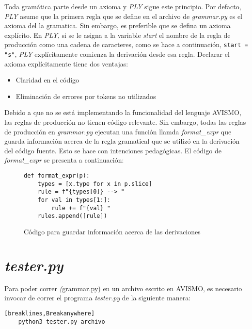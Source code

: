 Toda gramática parte desde un axioma y \textit{PLY} sigue este principio.
Por defacto, \textit{PLY} asume que la primera regla que se define en el archivo de \textit{grammar.py} es el axioma del la gramatica.
Sin embargo, es preferible que se defina un axioma explícito.
En \textit{PLY}, si se le asigna a la variable \textit{start} el nombre de la regla de producción como una cadena de caracteres, como se hace a continuación, \texttt{start = "s"}, \textit{PLY} explícitamente comienza la derivación desde esa regla. Declarar el axioma explícitamente tiene dos ventajas:
\begin{itemize}
	\item Claridad en el código
	\item Eliminación de errores por tokens no utilizados
\end{itemize}

Debido a que no se está implementando la funcionalidad del lenguaje AVISMO, las reglas de producción no tienen código relevante. Sin embargo, todas las reglas de producción en \textit{grammar.py} ejecutan una función llamda \textit{format\_expr} que guarda información acerca de la regla gramatical que se utilizó en la derivación del código fuente.
Esto se hace con intenciones pedagógicas.
El código de \textit{format\_expr} se presenta a continuación:
\begin{figure}[H]
	\begin{verbatim}
def format_expr(p):
    types = [x.type for x in p.slice]
    rule = f"{types[0]} --> "
    for val in types[1:]:
        rule += f"{val} "
    rules.append([rule])
\end{verbatim}
	\caption{Código para guardar información acerca de las derivaciones}
	\label{fig: formatExpr}
\end{figure}

\section{\textit{tester.py}}

Para poder correr \textit(grammar.py) en un archivo escrito en AVISMO, es necesario invocar de correr el programa \textit{tester.py} de la siguiente manera:

\begin{verbatim}[breaklines,Breakanywhere]
	python3 tester.py archivo 
\end{verbatim}




